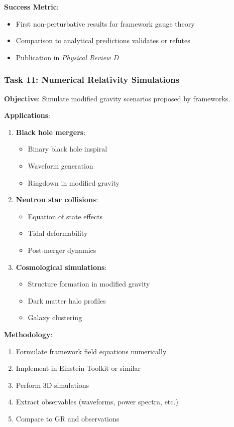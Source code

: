 \textbf{Success Metric}:
\begin{itemize}
    \item First non-perturbative results for framework gauge theory
    \item Comparison to analytical predictions validates or refutes
    \item Publication in \textit{Physical Review D}
\end{itemize}

\subsubsection{Task 11: Numerical Relativity Simulations}

\textbf{Objective}: Simulate modified gravity scenarios proposed by frameworks.

\textbf{Applications}:
\begin{enumerate}
    \item \textbf{Black hole mergers}:
    \begin{itemize}
        \item Binary black hole inspiral
        \item Waveform generation
        \item Ringdown in modified gravity
    \end{itemize}

    \item \textbf{Neutron star collisions}:
    \begin{itemize}
        \item Equation of state effects
        \item Tidal deformability
        \item Post-merger dynamics
    \end{itemize}

    \item \textbf{Cosmological simulations}:
    \begin{itemize}
        \item Structure formation in modified gravity
        \item Dark matter halo profiles
        \item Galaxy clustering
    \end{itemize}
\end{enumerate}

\textbf{Methodology}:
\begin{enumerate}
    \item Formulate framework field equations numerically
    \item Implement in Einstein Toolkit or similar
    \item Perform 3D simulations
    \item Extract observables (waveforms, power spectra, etc.)
    \item Compare to GR and observations
\end{enumerate}

